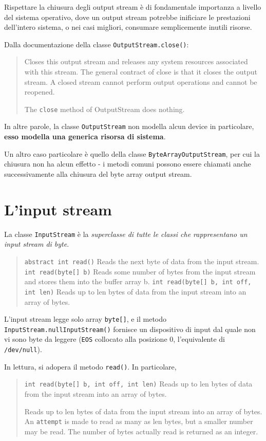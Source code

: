 \documentclass[\fontsizeclass,twocolumn]{\classname}
\theoremstyle{definition}
\theoremstyle{definition}
\begin{document}
Rispettare la chiusura degli output stream è di fondamentale importanza a
livello del sistema operativo, dove un output stream potrebbe inificiare le
prestazioni dell'intero sistema, o nei casi migliori, consumare semplicemente
inutili risorse.

Dalla documentazione della classe \texttt{OutputStream.close()}:
\begin{quote}
    \footnotesize{

    Closes this output stream and releases any system resources associated with
    this stream. The general contract of close is that it closes the output
    stream. A closed stream cannot perform output operations and cannot be
    reopened.

    The \texttt{close} method of OutputStream does nothing.
}
\end{quote}

In altre parole, la classe \texttt{Output\-Stream} non modella alcun device in
particolare, \textbf{esso modella una generica risorsa di sistema}.

Un altro caso particolare è quello della classe \texttt{ByteArrayOutputStream},
per cui la chiusura non ha alcun effetto \-- i metodi comuni possono essere
chiamati anche successivamente alla chiusura del byte array output stream.

\section{L'input stream}

La classe \texttt{Input\-Stream} è la \emph{superclasse di tutte le classi che
rappresentano un input stream di byte}.


\begin{quote}
    \footnotesize{\texttt{abstract int 	read()} 	Reads the next byte of data from the input stream.
        \texttt{int 	read(byte[] b)} 	Reads some number of bytes from the input stream and stores them into the buffer array b.
    \texttt{int 	read(byte[] b, int off, int len)} 	Reads up to len bytes of data from the input stream into an array of bytes.}
\end{quote}

L'input stream legge solo array \texttt{byte[]}, e il metodo
\texttt{InputStream.nullInputStream()} fornisce un dispositivo di input dal
quale non vi sono byte da leggere (\texttt{EOS} collocato alla posizione 0,
l'equivalente di \texttt{/dev/null}).

In lettura, si adopera il metodo \texttt{read()}. In particolare,
\begin{quote}
    \footnotesize{\texttt{int 	read(byte[] b, int off, int len)} 	Reads up to
    len bytes of data from the input stream into an array of bytes.

Reads up to len bytes of data from the input stream into an array of bytes. An
\texttt{attempt} is made to read as many as len bytes, but a smaller number may be read.
The number of bytes actually read is returned as an integer.}
\end{quote}
\end{document}
